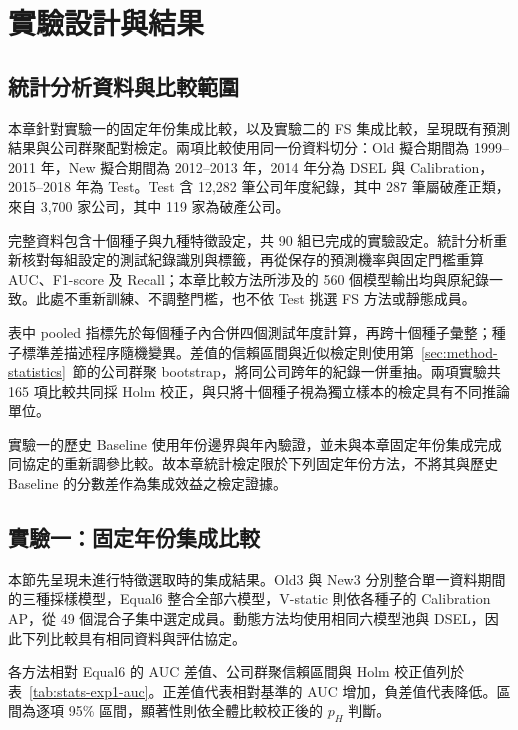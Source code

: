 \chapter{實驗設計與結果}\label{chap:results}
\begingroup
\setlength{\emergencystretch}{2em}

\section{統計分析資料與比較範圍}

本章針對實驗一的固定年份集成比較，以及實驗二的 FS 集成比較，呈現既有預測結果與公司群聚配對檢定。兩項比較使用同一份資料切分：Old 擬合期間為 1999--2011 年，New 擬合期間為 2012--2013 年，2014 年分為 DSEL 與 Calibration，2015--2018 年為 Test。Test 含 12,282 筆公司年度紀錄，其中 287 筆屬破產正類，來自 3,700 家公司，其中 119 家為破產公司。

完整資料包含十個種子與九種特徵設定，共 90 組已完成的實驗設定。統計分析重新核對每組設定的測試紀錄識別與標籤，再從保存的預測機率與固定門檻重算 AUC、F1-score 及 Recall；本章比較方法所涉及的 560 個模型輸出均與原紀錄一致。此處不重新訓練、不調整門檻，也不依 Test 挑選 FS 方法或靜態成員。

表中 pooled 指標先於每個種子內合併四個測試年度計算，再跨十個種子彙整；種子標準差描述程序隨機變異。差值的信賴區間與近似檢定則使用第~\ref{sec:method-statistics}~節的公司群聚 bootstrap，將同公司跨年的紀錄一併重抽。兩項實驗共 165 項比較共同採 Holm 校正，與只將十個種子視為獨立樣本的檢定具有不同推論單位。

實驗一的歷史 Baseline 使用年份邊界與年內驗證，並未與本章固定年份集成完成同協定的重新調參比較。故本章統計檢定限於下列固定年份方法，不將其與歷史 Baseline 的分數差作為集成效益之檢定證據。

\section{實驗一：固定年份集成比較}\label{sec:results-experiment1}

本節先呈現未進行特徵選取時的集成結果。Old3 與 New3 分別整合單一資料期間的三種採樣模型，Equal6 整合全部六模型，V-static 則依各種子的 Calibration AP，從 49 個混合子集中選定成員。動態方法均使用相同六模型池與 DSEL，因此下列比較具有相同資料與評估協定。



各方法相對 Equal6 的 AUC 差值、公司群聚信賴區間與 Holm 校正值列於表~\ref{tab:stats-exp1-auc}。正差值代表相對基準的 AUC 增加，負差值代表降低。區間為逐項 95\% 區間，顯著性則依全體比較校正後的 \(p_H\) 判斷。

